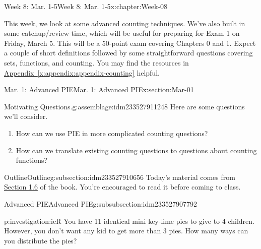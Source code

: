 \documentclass[oneside,10pt,]{book}
\newcommand{\xreffont}{\relax}
\numberwithin{equation}{section}
\begin{document}
\begin{chapterptx}{Week 8: Mar. 1-5}{}{Week 8: Mar. 1-5}{}{}{x:chapter:Week-08}
\begin{introduction}{}%
This week, we look at some advanced counting techniques. We've also built in some catchup\slash{}review time, which will be useful for preparing for Exam 1 on Friday, March 5. This will be a 50-point exam covering Chapters 0 and 1. Expect a couple of short definitions followed by some straightforward questions covering sets, functions, and counting. You may find the resources in \hyperref[x:appendix:appendix-counting]{Appendix~{\xreffont\ref{x:appendix:appendix-counting}}} helpful.%
\end{introduction}%
%
%
\typeout{************************************************}
\typeout{************************************************}
%
\begin{sectionptx}{Mar. 1: Advanced PIE}{}{Mar. 1: Advanced PIE}{}{}{x:section:Mar-01}
\begin{introduction}{}%
\begin{assemblage}{Motivating Questions.}{g:assemblage:idm233527911248}%
Here are some questions we'll consider. %
\begin{enumerate}
\item{}How can we use PIE in more complicated counting questions?%
\item{}How can we translate existing counting questions to questions about counting functions?%
\end{enumerate}
%
\end{assemblage}
\end{introduction}%
%
%
\typeout{************************************************}
\typeout{************************************************}
%
\begin{subsectionptx}{Outline}{}{Outline}{}{}{g:subsection:idm233527910656}
Today's material comes from \href{http://discrete.openmathbooks.org/dmoi3/sec_advPIE.html}{Section 1.6} of the book. You're encouraged to read it before coming to class.%
%
%
\typeout{************************************************}
\typeout{************************************************}
%
\begin{subsubsectionptx}{Advanced PIE}{}{Advanced PIE}{}{}{g:subsubsection:idm233527907792}
\begin{investigation}{}{p:investigation:icR}%
You have 11 identical mini key-lime pies to give to 4 children. However, you don't want any kid to get more than 3 pies. How many ways can you distribute the pies?%

\end{investigation}
\end{subsubsectionptx}
\end{subsectionptx}
\end{sectionptx}
\end{chapterptx}
\end{document}
